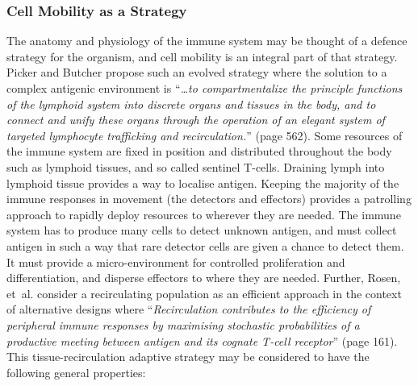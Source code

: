\subsubsection{Cell Mobility as a Strategy}
\label{subsubsec:tissues:migration:mobility:strategy}
The anatomy and physiology of the immune system may be thought of a defence strategy for the organism, and cell mobility is an integral part of that strategy. Picker and Butcher propose such an evolved strategy where the solution to a complex antigenic environment is ``\emph{\ldots to compartmentalize the principle functions of the lymphoid system into discrete organs and tissues in the body, and to connect and unify these organs through the operation of an elegant system of targeted lymphocyte trafficking and recirculation.}'' \cite{Picker1992} (page 562). Some resources of the immune system are fixed in position and distributed throughout the body such as lymphoid tissues, and so called sentinel T-cells. Draining lymph into lymphoid tissue provides a way to localise antigen. Keeping the majority of the immune responses in movement (the detectors and effectors) provides a patrolling approach to rapidly deploy resources to wherever they are needed. The immune system has to produce many cells to detect unknown antigen, and must collect antigen in such a way that rare detector cells are given a chance to detect them. It must provide a micro-environment for controlled proliferation and differentiation, and disperse effectors to where they are needed. Further, Rosen, et~al. consider a recirculating population as an efficient approach in the context of alternative designs where ``\emph{Recirculation contributes to the efficiency of peripheral immune responses by maximising stochastic probabilities of a productive meeting between antigen and its cognate T-cell receptor}'' \cite{Rosen2003} (page 161). This tissue-recirculation adaptive strategy may be considered to have the following general properties:

